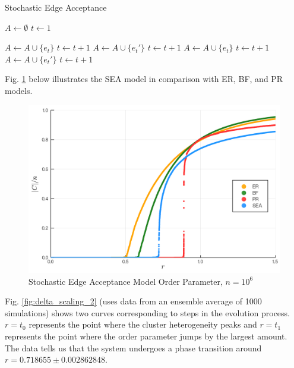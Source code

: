 \begin{algorithm}
	\caption{Stochastic Edge Acceptance}\label{Stochastic-Edge-Acceptance}
	\begin{algorithmic}[1]
		\State $A \gets \emptyset$
		\State $t \gets 1$

				\State $A \gets A \cup \{e_t\}$
				\State $t \gets t+1$
				\State $A \gets A \cup \{e_t'\}$
				\State $t \gets t+1$
				\State $A \gets A \cup \{e_t\}$
				\State $t \gets t+1$
			\Else
				\State $A \gets A \cup \{e_t'\}$
				\State $t \gets t+1$
			\EndIf
		\EndWhile
	\EndProcedure
	\end{algorithmic}
\end{algorithm}

Fig. \ref{fig:ER_BF_PR_SEA_transition} below illustrates the SEA model in comparison with ER, BF, and PR models.

\begin{figure}[H]
	\centering
	\includegraphics[width=350pt, clip]{images/Network_ER_BF_PR_SEA_1e6_order_param.png}
	\caption{Stochastic Edge Acceptance Model Order Parameter, $n = 10^6$}
	\label{fig:ER_BF_PR_SEA_transition}
\end{figure}

Fig. \ref{fig:delta_scaling_2} (uses data from an ensemble average of 1000 simulations) shows two curves corresponding to steps in the evolution process.
$r = t_0$ represents the point where the cluster heterogeneity peaks and $r = t_1$ represents the point where the order parameter jumps by the largest amount.
The data tells us that the system undergoes a phase transition around $r = 0.718655 \pm 0.002862848$.

